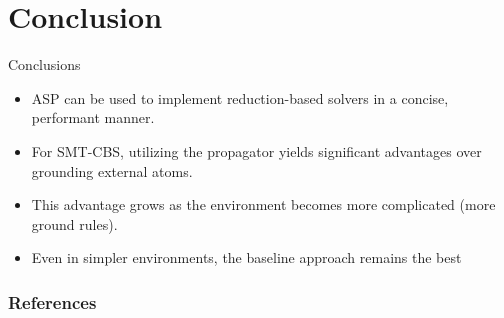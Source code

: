 \documentclass[aspectratio=169,xcolor=svgnames]{beamer}
\theoremstyle{theoremstyle_space}
\begin{document}
\section{Conclusion}
\begin{frame}[t]{Conclusions}
    \begin{itemize}
        \item ASP can be used to implement reduction-based solvers in a concise, performant manner.
        \item For SMT-CBS, utilizing the propagator yields significant advantages over grounding external atoms.
        \item This advantage grows as the environment becomes more complicated (more ground rules).
        \item Even in simpler environments, the baseline approach remains the best
    \end{itemize}
\end{frame}


\begin{frame}[allowframebreaks]\frametitle{References}
    
    
\end{frame}
\end{document}

